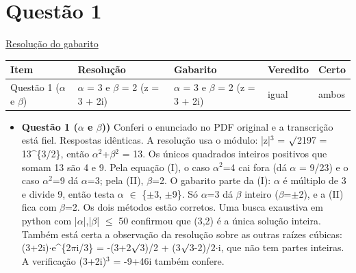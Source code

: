 \documentclass{article}%
\begin{document}
\section*{Questão 1}%
\href{https://poliedroresolve.sistemapoliedro.com.br/vestibulares/ime/2026/ime-2-fase-dia-1-23-10-2025-2-fase-dia-1/dissertativa-1-matematica-2-fase-dia-1-ime-2026}{Resolução do gabarito}\par\smallskip%
\begin{longtable}{@{}p{} p{} p{} p{} p{}@{}}\toprule Item & Resolução & Gabarito & Veredito & Certo \\ \midrule
Questão 1 ($\alpha$ e $\beta$) & $\alpha$ = 3 e $\beta$ = 2 (z = 3 + 2i) & $\alpha$ = 3 e $\beta$ = 2 (z = 3 + 2i) & igual & ambos \\
\bottomrule\end{longtable}%
\begin{itemize}%
\item%
\textbf{Questão 1 ($\alpha$ e $\beta$))} Conferi o enunciado no PDF original e a transcrição está fiel. Respostas idênticas. A resolução usa o módulo: |z|$^3$ = $\surd$2197 = 13\^{}\{3/2\}, então $\alpha$$^2$+$\beta$$^2$ = 13. Os únicos quadrados inteiros positivos que somam 13 são 4 e 9. Pela equação (I), o caso $\alpha$$^2$=4 cai fora (dá $\alpha$ = 9/23) e o caso $\alpha$$^2$=9 dá $\alpha$=3; pela (II), $\beta$=2. O gabarito parte da (I): $\alpha$ é múltiplo de 3 e divide 9, então testa $\alpha$ $\in$ \{$\pm$3, $\pm$9\}. Só $\alpha$=3 dá $\beta$ inteiro ($\beta$=$\pm$2), e a (II) fica com $\beta$=2. Os dois métodos estão corretos. Uma busca exaustiva em python com |$\alpha$|,|$\beta$| $\leq$ 50 confirmou que (3,2) é a única solução inteira. Também está certa a observação da resolução sobre as outras raízes cúbicas: (3+2i)$\cdot$e\^{}\{2$\pi$i/3\} = -(3+2$\surd$3)/2 + (3$\surd$3-2)/2$\cdot$i, que não tem partes inteiras. A verificação (3+2i)$^3$ = -9+46i também confere.%
\end{itemize}%
\end{document}

